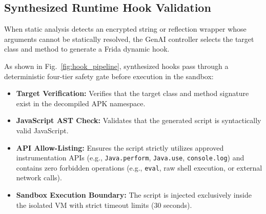 \documentclass[conference]{IEEEtran}
\begin{document}
\subsection{Synthesized Runtime Hook Validation}
When static analysis detects an encrypted string or reflection wrapper whose arguments cannot be statically resolved, the GenAI controller selects the target class and method to generate a Frida dynamic hook.

As shown in Fig.~\ref{fig:hook_pipeline}, synthesized hooks pass through a deterministic four-tier safety gate before execution in the sandbox:
\begin{itemize}
    \item \textbf{Target Verification:} Verifies that the target class and method signature exist in the decompiled APK namespace.
    \item \textbf{JavaScript AST Check:} Validates that the generated script is syntactically valid JavaScript.
    \item \textbf{API Allow-Listing:} Ensures the script strictly utilizes approved instrumentation APIs (e.g., \texttt{Java.perform}, \texttt{Java.use}, \texttt{console.log}) and contains zero forbidden operations (e.g., \texttt{eval}, raw shell execution, or external network calls).
    \item \textbf{Sandbox Execution Boundary:} The script is injected exclusively inside the isolated VM with strict timeout limits (30 seconds).
\end{itemize}
\end{document}
